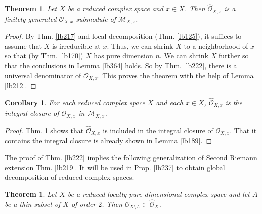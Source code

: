 \documentclass[12pt,b5paper,notitlepage]{report}
\theoremstyle{definition}
\theoremstyle{plain}
\newtheorem{thm}[df]{Theorem}
\newtheorem{co}[df]{Corollary}
\newcommand{\scr}{\mathscr}
\newcommand{\Owht}{\widehat{\scr O}}
\numberwithin{equation}{section}
\begin{document}
\begin{thm}\label{lb216}
Let $X$ be a reduced complex space and $x\in X$. Then $\Owht_{X,x}$ is a finitely-generated $\scr O_{X,x}$-submodule of $\scr M_{X,x}$. 
\end{thm}



\begin{proof}
By Thm. \ref{lb217} and local decomposition (Thm. \ref{lb125}), it suffices to assume that $X$ is irreducible at $x$. Thus, we can shrink $X$ to a neighborhood of $x$ so that (by Thm. \ref{lb170}) $X$ has pure dimension $n$. We can shrink $X$ further so that the conclusions in Lemma \ref{lb364} holds.  So by Thm. \ref{lb222}, there is a universal denominator of $\scr O_{X,x}$. This proves the theorem with the help of Lemma \ref{lb212}.
\end{proof}




\begin{co}\label{lb220}
For each reduced complex space $X$ and each $x\in X$, $\Owht_{X,x}$ is the integral closure of $\scr O_{X,x}$ in $\scr M_{X,x}$.
\end{co}




\begin{proof}
Thm. \ref{lb216} shows that $\Owht_{X,x}$ is included in the integral closure of $\scr O_{X,x}$. That it contains the integral closure is already shown in Lemma \ref{lb189}.
\end{proof}



The proof of Thm. \ref{lb222} implies the following generalization of Second Riemann extension Thm. \ref{lb219}. It will be used in Prop. \ref{lb237} to obtain global decomposition of reduced complex spaces.

\begin{thm}\label{lb235}
Let $X$ be a reduced locally pure-dimensional complex space and let $A$ be a thin subset of $X$ of order $2$. Then $\scr O_{X\setminus A}\subset\Owht_X$.
\end{thm}
\end{document}
